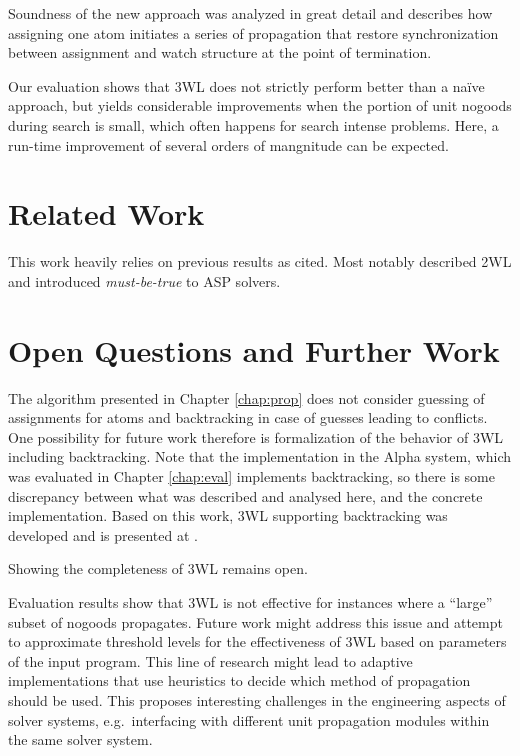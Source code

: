\documentclass{vutinfth} %
\newcommand{\mbt}{must-be-true\xspace}
\begin{document}
Soundness of the new approach was analyzed in great detail and describes how assigning one atom initiates a series of propagation that restore synchronization between assignment and watch structure at the point of termination.

Our evaluation shows that 3WL does not strictly perform better than a na\"{i}ve approach, but yields considerable improvements when the portion of unit nogoods during search is small, which often happens for search intense problems. Here, a run-time improvement of several orders of mangnitude can be expected.

\section{Related Work}

This work heavily relies on previous results as cited. Most notably \citet{effsat,questsat} described 2WL and \citet{dlv-mbt} introduced \emph{\mbt} to ASP solvers.

\section{Open Questions and Further Work}

The algorithm presented in Chapter \ref{chap:prop} does not consider guessing of assignments for atoms and backtracking in case of guesses leading to conflicts. One possibility for future work therefore is formalization of the behavior of 3WL including backtracking. Note that the implementation in the Alpha system, which was evaluated in Chapter \ref{chap:eval} implements backtracking, so there is some discrepancy between what was described and analysed here, and the concrete implementation. Based on this work, 3WL supporting backtracking was developed and is presented at \cite{alpha-techniques}.

Showing the completeness of 3WL remains open.

Evaluation results show that 3WL is not effective for instances where a \enquote{large} subset of nogoods propagates. Future work might address this issue and attempt to approximate threshold levels for the effectiveness of 3WL based on parameters of the input program. This line of research might lead to adaptive implementations that use heuristics to decide which method of propagation should be used. This proposes interesting challenges in the engineering aspects of solver systems, e.g.~interfacing with different unit propagation modules within the same solver system.
\end{document}
